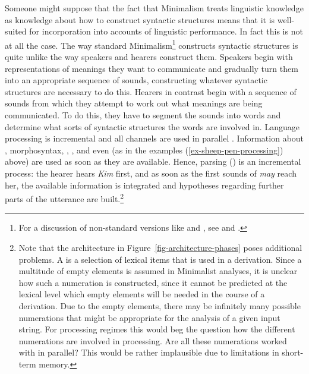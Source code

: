 \documentclass[output=paper,biblatex,babelshorthands,newtxmath,draftmode,colorlinks,citecolor=brown]{langscibook}
\begin{document}
Someone might suppose that the fact that Minimalism treats linguistic knowledge as knowledge about
how to construct syntactic structures means that it is well-suited for incorporation into accounts
of linguistic performance. In fact this is not at all the case. The way standard
Minimalism\footnote{%
For a discussion of non-standard versions like \citet{Phillips2003a} and \citet{Chesi2015a-u}, see
 and .%
} constructs syntactic structures is quite unlike the way speakers and hearers construct them. Speakers begin
with representations of meanings they want to communicate and gradually turn them into an
appropriate sequence of sounds, constructing whatever syntactic structures are necessary to do
this. Hearers in contrast begin with a sequence of sounds from which they attempt to work out what
meanings are being communicated. To do this, they have to segment the sounds into words and
determine what sorts of syntactic structures the words are involved in. 
Language processing is incremental and all channels are used in
parallel \citep{Marslen-Wilson75a,TSKES95a,TSKES96a}. Information about , morphosyntax, , , and even
 (as in the examples (\ref{ex-sheep-pen-processing}) above) are used as soon as they
are available. Hence, parsing () is an incremental process: the hearer hears \emph{Kim} first,
and as soon as the first sounds of \emph{may} reach her, the available information is integrated
and hypotheses regarding further parts of the utterance are built.\footnote{\label{fn-numeration}%
  Note that the architecture in Figure~\ref{fig-architecture-phases} poses additional problems. A
  \emph{} is a selection of lexical items that is used in a derivation. Since a multitude
  of empty elements is assumed in Minimalist analyses, it is unclear how such a numeration is
  constructed, since it cannot be predicted at the lexical level which empty elements will be needed in the course of a
  derivation. Due to the empty elements, there may be infinitely many possible numerations
that might be  appropriate for the analysis of a given input string. For processing regimes this
would beg the question how the different numerations are involved in processing. Are all these
numerations worked with in parallel? This would be rather implausible due to limitations in
short-term memory.
}
\end{document}
